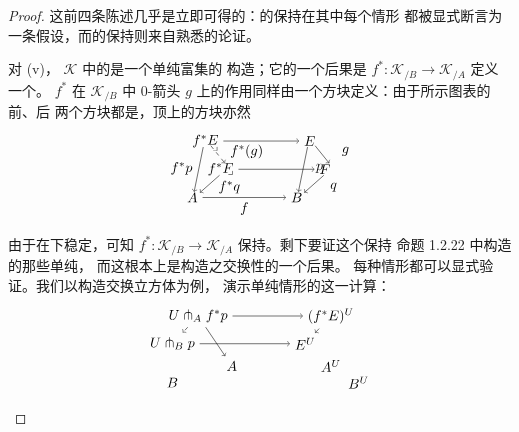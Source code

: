 \begin{proof}
这前四条陈述几乎是立即可得的：\trIsofibration{}的保持在其中每个情形
都被显式断言为一条假设，而\trLimit{}的保持则来自熟悉的论证。

对 (v)，\trInfinityCosmos{} $\mathcal{K}$ 中的\trPullback{}是一个单纯富集的%
\trLimit{}构造；它的一个后果是%
$f^\ast\colon\mathcal{K}_{/B}\to\mathcal{K}_{/A}$
定义一个\trSimplicialFunctor{}。\trFunctor{} $f^\ast$ 在 $\mathcal{K}_{/B}$ 中
0-箭头 $g$ 上的作用同样由一个\trPullback{}方块定义：由于所示图表的前、后
两个方块都是\trPullback{}，顶上的方块亦然
\begin{equation*}
\begin{tikzpicture}[x=1.55em,y=1.35em]
  \node (fsE) at (0.6,3)   {$f^\ast E$};
  \node (E)   at (5.4,3)   {$E$};
  \node (fsF) at (1.3,1.5) {$f^\ast F$};
  \node (F)   at (6.1,1.5) {$F$};
  \node (A)   at (0,0)     {$A$};
  \node (B)   at (4.8,0)   {$B$};
  \draw[->] (fsE) -- (E);
  \draw[->] (fsF) -- (F);
  \draw[->] (A) -- (B) node[midway,below]{$f$};
  \draw[->] (0.5,2.68) -- (0.08,0.3);
  \node at (-0.5,1.55) {$f^\ast p$};
  \draw[->,dashed] (0.85,2.75) -- (1.5,1.82);
  \node at (2.5,2.45) {$f^{\ast}(g)$};
  \draw[->] (1.25,1.18) -- (0.35,0.26);
  \node at (1.7,0.55) {$f^\ast q$};
  \draw[->] (5.3,2.68) -- (4.88,0.3);
  \node at (5.85,1.55) {$p$};
  \draw[->] (5.65,2.75) -- (6.3,1.82);
  \node at (7.05,2.45) {$g$};
  \draw[->] (6.05,1.18) -- (5.15,0.26);
  \node at (6.5,0.55) {$q$};
  \node at (1.05,2.6) {$\scriptstyle\lrcorner$};
  \node at (1.75,1.32) {$\scriptstyle\lrcorner$};
\end{tikzpicture}
\end{equation*}
由于\trIsofibration{}在\trPullback{}下稳定，可知
$f^\ast\colon\mathcal{K}_{/B}\to\mathcal{K}_{/A}$
保持\trIsofibration{}。剩下要证这个\trFunctor{}保持
命题 1.2.22 中构造的那些单纯\trLimit{}，%
而这根本上是\trLimit{}构造之交换性的一个后果。
每种情形都可以显式验证。我们以构造交换立方体为例，
演示单纯\trCotensor{}情形的这一计算：
\begin{equation*}
\begin{tikzpicture}[x=1.42em,y=1.32em]
  \node (tfl) at (1.3,3.6) {$U\pitchfork_A f^\ast p$};
  \node (tfr) at (8.0,3.6) {$(f^\ast E)^U$};
  \node (tbl) at (0,2.1)   {$U\pitchfork_B p$};
  \node (tbr) at (6.7,2.1) {$E^U$};
  \node (bfl) at (3.0,0.9) {$A$};
  \node (bfr) at (8.0,0.9) {$A^U$};
  \node (bbl) at (0,0)     {$B$};
  \node (bbr) at (9.4,0)   {$B^U$};
  \draw[->] (tfl) -- (tfr);
  \draw[->,dashed] (tfl) -- (tbl);
  \draw[->] (tbl) -- (tbr);
  \draw[->] (tfr) -- (tbr);
  \draw[->] (tfl) -- (bfl);

\end{tikzpicture}
\end{equation*}
\end{proof}
